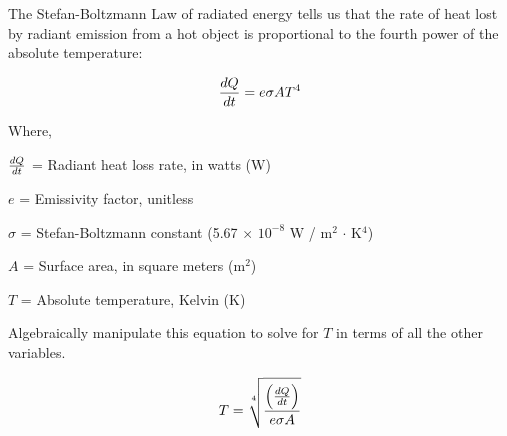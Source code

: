 

The Stefan-Boltzmann Law of radiated energy tells us that the rate of heat lost by radiant emission from a hot object is proportional to the fourth power of the absolute temperature:

$${dQ \over dt} = e \sigma A T^4$$

\noindent
Where,

$dQ \over dt$ = Radiant heat loss rate, in watts (W)

$e$ = Emissivity factor, unitless

$\sigma$ = Stefan-Boltzmann constant (5.67 $\times$ $10^{-8}$ W / m$^{2}$ $\cdot$ K$^{4}$)

$A$ = Surface area, in square meters (m$^{2}$)

$T$ = Absolute temperature, Kelvin (K)

\vskip 10pt

Algebraically manipulate this equation to solve for $T$ in terms of all the other variables.







$$T = \root 4 \of {\left({dQ \over dt}\right) \over {e \sigma A}}$$











